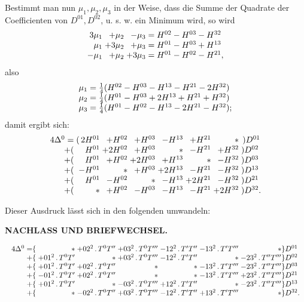 Bestimmt man nun \(\mu_1,\mu_2,\mu_3\) in der Weise, dass die Summe der Quadrate der Coefficienten von \(D^{01},D^{02}\), u. s. w. ein Minimum wird, so wird
\[
\begin{array}{@{}r@{\;}r@{\;}r@{\;=\;}l@{}}
 3\mu_1&+\mu_2&-\mu_3&H^{02}-H^{03}-H^{32}\\
 \mu_1&+3\mu_2&+\mu_3&H^{01}-H^{03}+H^{13}\\
 -\mu_1&+\mu_2&+3\mu_3&H^{01}-H^{02}-H^{21},
\end{array}
\]
\noindent also
\[
\begin{array}{@{}r@{\;=\;}l@{}}
 \mu_1&\tfrac14(H^{02}-H^{03}-H^{13}-H^{21}-2H^{32})\\
 \mu_2&\tfrac14(H^{01}-H^{03}+2H^{13}+H^{21}+H^{32})\\
 \mu_3&\tfrac14(H^{01}-H^{02}-H^{13}-2H^{21}-H^{32});
\end{array}
\]
\noindent damit ergibt sich:
\[
\begin{array}{@{}r@{\;}r@{\;}r@{\;}r@{\;}r@{\;}r@{\;}r@{\;}l@{}}
 4\Delta^0=&(\,2H^{01}&+H^{02}&+H^{03}&-H^{13}&+H^{21}&\ast&\,)D^{01}\\
 +(&H^{01}&+2H^{02}&+H^{03}&\ast&-H^{21}&+H^{32}&)D^{02}\\
 +(&H^{01}&+H^{02}&+2H^{03}&+H^{13}&\ast&-H^{32}&)D^{03}\\
 +(&-H^{01}&\ast&+H^{03}&+2H^{13}&-H^{21}&-H^{32}&)D^{13}\\
 +(&H^{01}&-H^{02}&\ast&-H^{13}&+2H^{21}&-H^{32}&)D^{21}\\
 +(&\ast&+H^{02}&-H^{03}&-H^{13}&-H^{21}&+2H^{32}&)D^{32}.
\end{array}
\]

Dieser Ausdruck lässt sich in den folgenden umwandeln:

\par\clearpage
\noindent{}\hfill{\small\textbf{NACHLASS UND BRIEFWECHSEL.}}\hfill\null\par\medskip

\[
\resizebox{\linewidth}{!}{\(\begin{array}{@{}r@{}r@{\;}r@{\;}r@{\;}r@{\;}r@{\;}r@{\;}r@{}l@{}}
 4\Delta^0=&\{&\ast&+02^2\,.\,T^0T''&+03^2\,.\,T^0T'''&-12^2\,.\,T'T''&-13^2\,.\,T'T'''&\ast&\}D^{01}\\
 +&\{&+01^2\,.\,T^0T'&\ast&+03^2\,.\,T^0T'''&-12^2\,.\,T'T''&\ast&-23^2\,.\,T''T'''&\}D^{02}\\
 +&\{&+01^2\,.\,T^0T'&+02^2\,.\,T^0T''&\ast&\ast&-13^2\,.\,T'T'''&-23^2\,.\,T''T'''&\}D^{03}\\
 +&\{&-01^2\,.\,T^0T'&+02^2\,.\,T^0T''&\ast&\ast&-13^2\,.\,T'T'''&+23^2\,.\,T''T'''&\}D^{21}\\
 +&\{&+01^2\,.\,T^0T'&\ast&-03^2\,.\,T^0T'''&+12^2\,.\,T'T''&\ast&-23^2\,.\,T''T'''&\}D^{13}\\
 +&\{&\ast&-02^2\,.\,T^0T''&+03^2\,.\,T^0T'''&-12^2\,.\,T'T''&+13^2\,.\,T'T'''&\ast&\}D^{32}.
\end{array}\)}
\]

